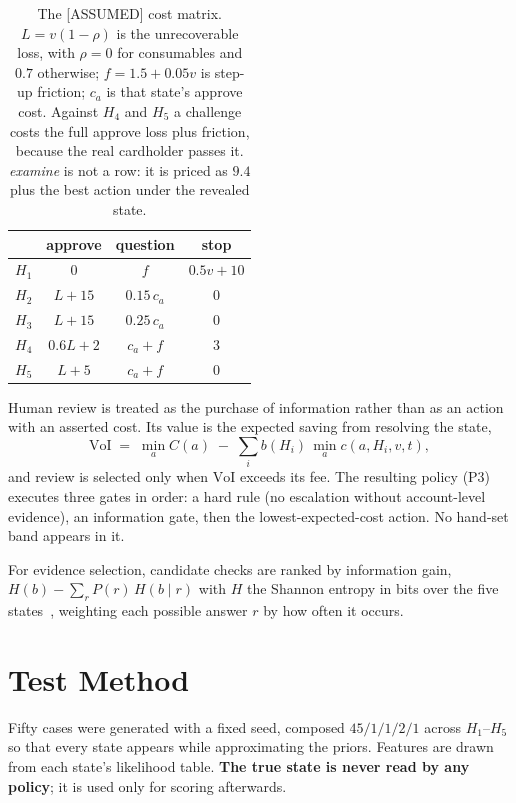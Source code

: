 \documentclass{article}
\begin{document}
\begin{table}[t]
\centering
\small
\begin{tabular}{lccc}
\toprule
& \textbf{approve} & \textbf{question} & \textbf{stop} \\
\midrule
$H_1$        & $0$        & $f$              & $0.5v + 10$ \\
$H_2$        & $L + 15$   & $0.15\,c_a$      & $0$ \\
$H_3$        & $L + 15$   & $0.25\,c_a$      & $0$ \\
$H_4$        & $0.6L + 2$ & $c_a + f$        & $3$ \\
$H_5$        & $L + 5$    & $c_a + f$        & $0$ \\
\bottomrule
\end{tabular}
\caption{The [ASSUMED] cost matrix. $L = v(1-\rho)$ is the unrecoverable loss, with
$\rho = 0$ for consumables and $0.7$ otherwise; $f = 1.5 + 0.05v$ is step-up friction;
$c_a$ is that state's approve cost. Against $H_4$ and $H_5$ a challenge costs the full
approve loss plus friction, because the real cardholder passes it. \emph{examine} is not a
row: it is priced as $9.4$ plus the best action under the revealed state.}
\label{tab:costs}
\end{table}
Human review is treated as the purchase of information rather than as an action with an
asserted cost. Its value is the expected saving from resolving the state,
\begin{equation}
\mathrm{VoI} \;=\; \min_a C(a) \;-\; \sum_i b(H_i)\, \min_a c(a, H_i, v, t),
\end{equation}
and review is selected only when $\mathrm{VoI}$ exceeds its fee. The resulting policy (P3)
executes three gates in order: a hard rule (no escalation without account-level evidence),
an information gate, then the lowest-expected-cost action. No hand-set band appears in it.

For evidence selection, candidate checks are ranked by information gain,
$H(b) - \sum_{r} P(r)\,H(b \mid r)$ with $H$ the Shannon entropy in bits over the five
states~\cite{shannon1948}, weighting each possible answer $r$ by how often it occurs.

\section{Test Method}
\label{sec:method}

Fifty cases were generated with a fixed seed, composed $45/1/1/2/1$ across $H_1$--$H_5$ so
that every state appears while approximating the priors. Features are drawn from each
state's likelihood table. \textbf{The true state is never read by any policy}; it is used
only for scoring afterwards.
\end{document}
